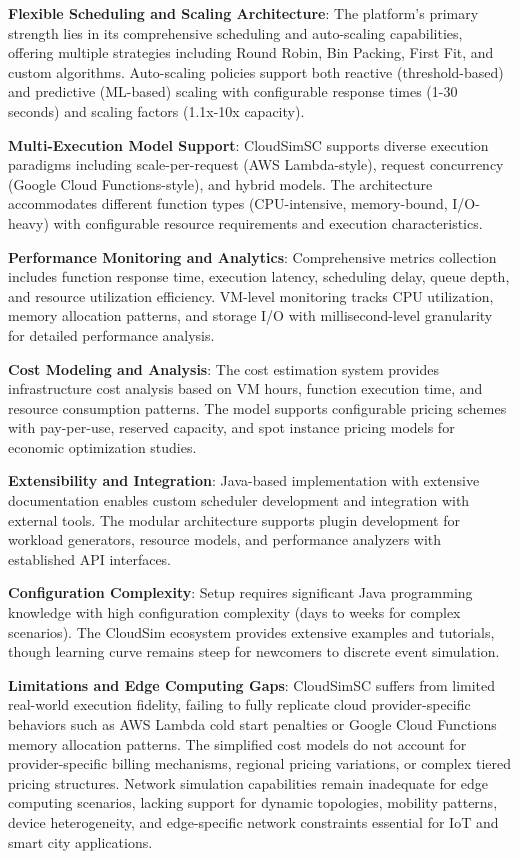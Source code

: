 \textbf{Flexible Scheduling and Scaling Architecture}: The platform's primary strength lies in its comprehensive scheduling and auto-scaling capabilities, offering multiple strategies including Round Robin, Bin Packing, First Fit, and custom algorithms. Auto-scaling policies support both reactive (threshold-based) and predictive (ML-based) scaling with configurable response times (1-30 seconds) and scaling factors (1.1x-10x capacity).

\textbf{Multi-Execution Model Support}: CloudSimSC supports diverse execution paradigms including scale-per-request (AWS Lambda-style), request concurrency (Google Cloud Functions-style), and hybrid models. The architecture accommodates different function types (CPU-intensive, memory-bound, I/O-heavy) with configurable resource requirements and execution characteristics.

\textbf{Performance Monitoring and Analytics}: Comprehensive metrics collection includes function response time, execution latency, scheduling delay, queue depth, and resource utilization efficiency. VM-level monitoring tracks CPU utilization, memory allocation patterns, and storage I/O with millisecond-level granularity for detailed performance analysis.

\textbf{Cost Modeling and Analysis}: The cost estimation system provides infrastructure cost analysis based on VM hours, function execution time, and resource consumption patterns. The model supports configurable pricing schemes with pay-per-use, reserved capacity, and spot instance pricing models for economic optimization studies.

\textbf{Extensibility and Integration}: Java-based implementation with extensive documentation enables custom scheduler development and integration with external tools. The modular architecture supports plugin development for workload generators, resource models, and performance analyzers with established API interfaces.

\textbf{Configuration Complexity}: Setup requires significant Java programming knowledge with high configuration complexity (days to weeks for complex scenarios). The CloudSim ecosystem provides extensive examples and tutorials, though learning curve remains steep for newcomers to discrete event simulation.

\textbf{Limitations and Edge Computing Gaps}: CloudSimSC suffers from limited real-world execution fidelity, failing to fully replicate cloud provider-specific behaviors such as AWS Lambda cold start penalties or Google Cloud Functions memory allocation patterns. The simplified cost models do not account for provider-specific billing mechanisms, regional pricing variations, or complex tiered pricing structures. Network simulation capabilities remain inadequate for edge computing scenarios, lacking support for dynamic topologies, mobility patterns, device heterogeneity, and edge-specific network constraints essential for IoT and smart city applications.

